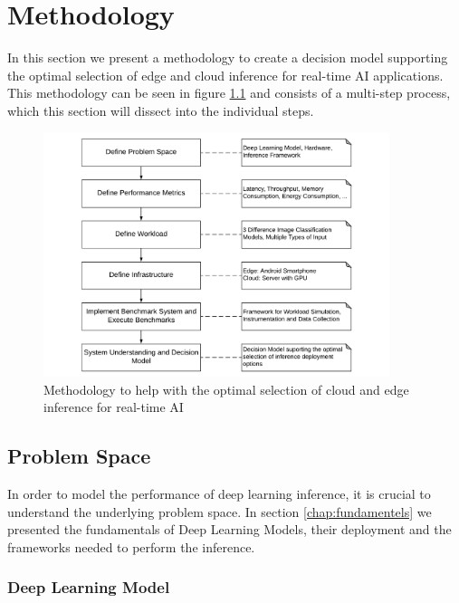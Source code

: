 \chapter{Methodology}
\label{chap:methodology}

In this section we present a methodology to create a decision model supporting the optimal selection of edge and cloud inference for real-time AI applications.
This methodology can be seen in figure \ref{fig:Methodology} and consists of a multi-step process, which this section will dissect into the individual steps.




\begin{figure}[H]
\centering
\includegraphics[width=0.9\textwidth]{./Bilder/Methodology.pdf}
\caption{Methodology to help with the optimal selection of cloud and edge inference for real-time AI}
\label{fig:Methodology}
\end{figure}


\section{Problem Space}
In order to model the performance of deep learning inference, it is crucial to understand the underlying problem space. 
In section \ref{chap:fundamentels} we presented the fundamentals of Deep Learning Models, their deployment and the frameworks needed to perform the inference.

\subsection{Deep Learning Model}

